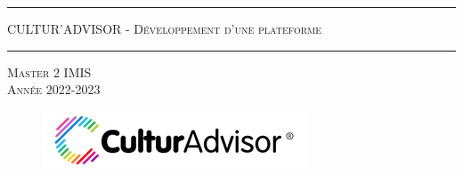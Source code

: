 \documentclass{article}
\begin{document}
\hrule
\begin{center}
\Huge {\textsc{CULTUR'ADVISOR - Développement d'une plateforme}}
\end{center}
\hrule
\vspace{10mm}
\begin{center}
\Large \textsc{Master 2 IMIS \\ Année 2022-2023}
\end{center}
\vspace{15mm}
\begin{figure}[H]
\hspace{-10mm}
\includegraphics[scale = 1.7]{images/logo.png}
\end{figure}
\vspace{30mm}
\end{document}
